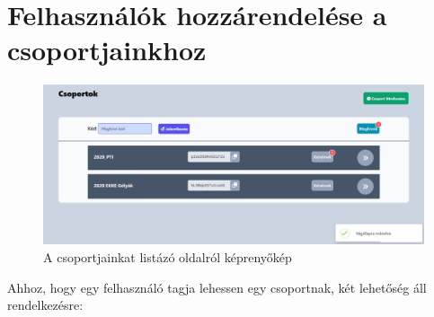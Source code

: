 \documentclass[
]{thesis-ekf}
\theoremstyle{definition}
\theoremstyle{remark}
\begin{document}
            \section{Felhasználók hozzárendelése a csoportjainkhoz}
                \begin{figure}[ht!]
    		        \centering
    		        \includegraphics[width=15cm]{Groups.index.png}
                    \caption{A csoportjainkat listázó oldalról képrenyőkép}
    		        \label{fig-csoportok-index}
    	    \end{figure}
                Ahhoz, hogy egy felhasználó tagja lehessen egy csoportnak, két lehetőség áll rendelkezésre:
\end{document}
